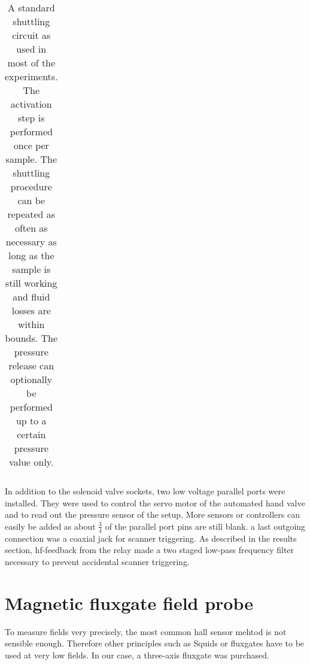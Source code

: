 \begin{table}
\begin{tabular}{| l | c | cccc | ccc | r |}
                    \hline 
                \end{tabular}
                \caption[15N hyperpolarization steps]{A standard shuttling circuit as used in most of the experiments. The activation step is performed once per sample. The shuttling procedure can be repeated as often as necessary as long as the sample is still working and fluid losses are within bounds. The pressure release can optionally be performed up to a certain pressure value only.}
                \label{table:matMeth:shuttlingCycle}
            \end{table}
            In addition to the solenoid valve sockets, two low voltage parallel ports were installed.  They were used to control the servo motor of the automated hand valve and to read out the pressure sensor of the setup. More sensors or controllers can easily be added as about $\frac{3}{4}$ of the parallel port pins are still blank.
            a last outgoing connection was a coaxial jack for scanner triggering.  As described in the results section, hf-feedback from the relay made a two staged low-pass frequency filter necessary to prevent accidental scanner triggering.
    \section{Magnetic fluxgate field probe}\label{sec:methodsfluxgate}
        To measure fields very precisely, the most common hall sensor mehtod is not sensible enough. Therefore other principles such as Squids or fluxgates have to be used at very low fields. In our case, a three-axis fluxgate was purchased.

